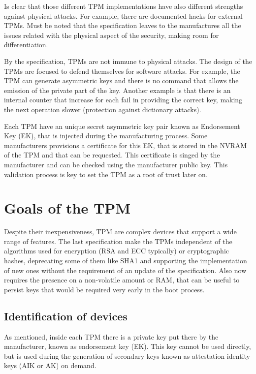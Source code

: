 \documentclass{article}
\begin{document}
Is clear that those different TPM implementations have also different
strengths against physical attacks.  For example, there are documented
hacks\cite{hack} for external TPMs. Must be noted that the
specification leaves to the manufactures all the issues related with
the physical aspect of the security, making room for differentiation.

By the specification, TPMs are not immune to physical attacks.  The
design of the TPMs are focused to defend themselves for software
attacks.  For example, the TPM can generate asymmetric keys and there
is no command that allows the emission of the private part of the key.
Another example is that there is an internal counter that increase for
each fail in providing the correct key, making the next operation
slower (protection against dictionary attacks).

Each TPM have an unique secret asymmetric key pair known as
Endorsement Key (EK), that is injected during the manufacturing
process.  Some manufacturers provisions a certificate for this EK,
that is stored in the NVRAM of the TPM and that can be requested.
This certificate is singed by the manufacturer and can be checked
using the manufacturer public key.  This validation process is key to
set the TPM as a root of trust later on.

\section{Goals of the TPM}
Despite their inexpensiveness, TPM are complex devices that support a
wide range of features.  The last specification make the TPMs
independent of the algorithms used for encryption (RSA and ECC
typically) or cryptographic hashes, deprecating some of them like SHA1
and supporting the implementation of new ones without the requirement
of an update of the specification.  Also now requires the presence on
a non-volatile amount or RAM, that can be useful to persist keys that
would be required very early in the boot process.

\subsection{Identification of devices}
As mentioned, inside each TPM there is a private key put there by the
manufacturer, known as endorsement key (EK).  This key cannot be used
directly, but is used during the generation of secondary keys known as
attestation identity keys (AIK or AK) on demand.
\end{document}
